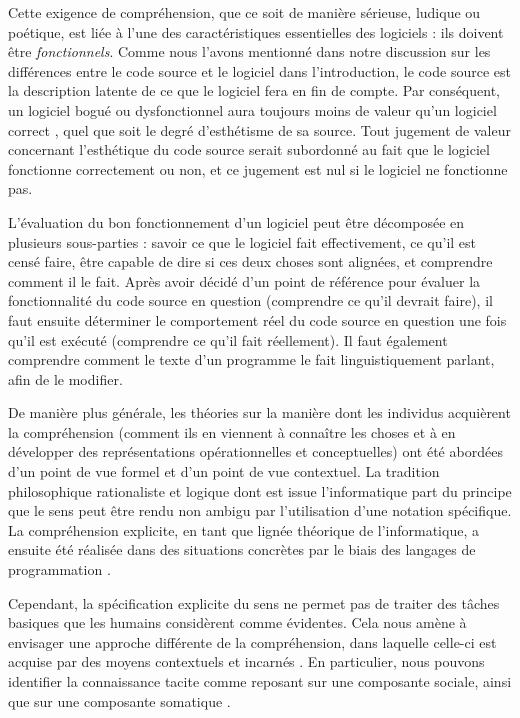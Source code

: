 \documentclass{article}
\begin{document}
Cette exigence de compréhension, que ce soit de manière sérieuse, ludique ou poétique, est liée à l'une des caractéristiques essentielles des logiciels : ils doivent être \emph{fonctionnels}. Comme nous l'avons mentionné dans notre discussion sur les différences entre le code source et le logiciel dans l'introduction, le code source est la description latente de ce que le logiciel fera en fin de compte. Par conséquent, un logiciel bogué ou dysfonctionnel aura toujours moins de valeur qu'un logiciel correct \citep{hill_what_2016}, quel que soit le degré d'esthétisme de sa source. Tout jugement de valeur concernant l'esthétique du code source serait subordonné au fait que le logiciel fonctionne correctement ou non, et ce jugement est nul si le logiciel ne fonctionne pas.

L'évaluation du bon fonctionnement d'un logiciel peut être décomposée en plusieurs sous-parties : savoir ce que le logiciel fait effectivement, ce qu'il est censé faire, être capable de dire si ces deux choses sont alignées, et comprendre comment il le fait. Après avoir décidé d'un point de référence pour évaluer la fonctionnalité du code source en question (comprendre ce qu'il devrait faire), il faut ensuite déterminer le comportement réel du code source en question une fois qu'il est exécuté (comprendre ce qu'il fait réellement). Il faut également comprendre comment le texte d'un programme le fait linguistiquement parlant, afin de le modifier.

De manière plus générale, les théories sur la manière dont les individus acquièrent la compréhension (comment ils en viennent à connaître les choses et à en développer des représentations opérationnelles et conceptuelles) ont été abordées d'un point de vue formel et d'un point de vue contextuel. La tradition philosophique rationaliste et logique dont est issue l'informatique part du principe que le sens peut être rendu non ambigu par l'utilisation d'une notation spécifique. La compréhension explicite, en tant que lignée théorique de l'informatique, a ensuite été réalisée dans des situations concrètes par le biais des langages de programmation \citep{depaz_stylistique_2023}.

Cependant, la spécification explicite du sens ne permet pas de traiter des tâches basiques que les humains considèrent comme évidentes. Cela nous amène à envisager une approche différente de la compréhension, dans laquelle celle-ci est acquise par des moyens contextuels et incarnés \citep{penny_making_2019}. En particulier, nous pouvons identifier la connaissance tacite comme reposant sur une composante sociale, ainsi que sur une composante somatique \citep{polanyi_knowing_1969}.
\end{document}
